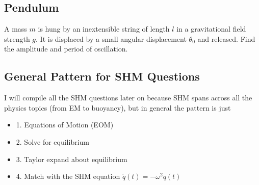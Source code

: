 \documentclass{article}
\begin{document}
\subsection{Pendulum}
A mass $m$ is hung by an inextensible string of length $l$ in a gravitational field strength $g$. It is displaced by a small angular displacement $\theta_0$ and released. Find the amplitude and period of oscillation.

\subsection{General Pattern for SHM Questions}
I will compile all the SHM questions later on because SHM spans across all the physics topics (from EM to buoyancy), but in general the pattern is just 
\begin{itemize}
    \item[] 1. Equations of Motion (EOM)
    \item[] 2. Solve for equilibrium
    \item[] 3. Taylor expand about equilibrium
    \item[] 4. Match with the SHM equation $\ddot q(t) = -\omega^2 q(t)$
\end{itemize}
\end{document}
